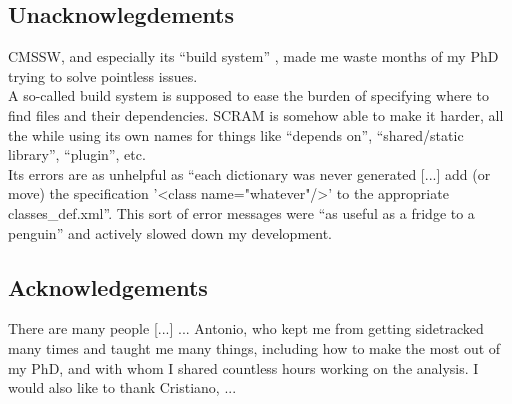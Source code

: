 \subsection{Unacknowlegdements}
CMSSW, and especially its ``build system'' , made me waste months of my PhD trying to solve pointless issues.\\
A so-called build system is supposed to ease the burden of specifying where to find files and their dependencies.
SCRAM is somehow able to make it harder, all the while using its own names for things like ``depends on'', ``shared/static library'', ``plugin'', etc.\\
Its errors are as unhelpful as ``each dictionary was never generated [...] add (or move) the specification '<class name="whatever"/>' to the appropriate classes_def.xml''.
This sort of error messages were ``as useful as a fridge to a penguin'' and actively slowed down my development.

\subsection{Acknowledgements}
There are many people 
[...]
... Antonio, who kept me from getting sidetracked many times and taught me many things, including how to make the most out of my PhD, and with whom I shared countless hours working on the analysis.
I would also like to thank Cristiano, ...
